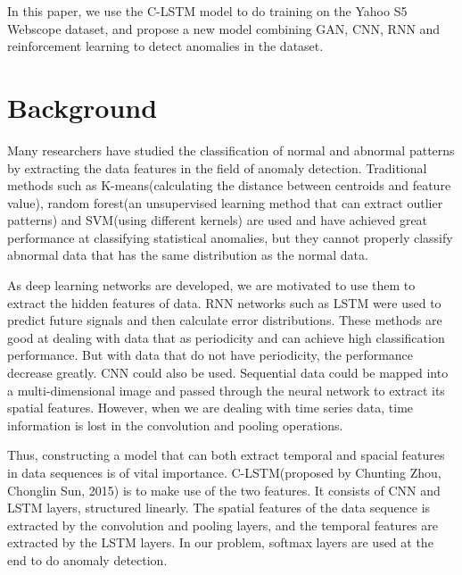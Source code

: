 \documentclass{acmtog} %
\begin{document}
In this paper, we use the C-LSTM model to do training on the Yahoo S5 Webscope dataset, and propose a new model combining GAN, CNN, RNN and reinforcement learning to detect anomalies in the dataset.



\section{Background}
Many researchers have studied the classification of normal and abnormal patterns by extracting the data features in the field of anomaly detection. Traditional methods such as K-means(calculating the distance between centroids and feature value), random forest(an unsupervised learning method that can extract outlier patterns) and SVM(using different kernels) are used and have achieved great performance at classifying statistical anomalies, but they cannot properly classify abnormal data that has the same distribution as the normal data. 

As deep learning networks are developed, we are motivated to use them to extract the hidden features of data. RNN networks such as LSTM were used to predict future signals and then calculate error distributions. These methods are good at dealing with data that as periodicity and can achieve high classification performance. But with data that do not have periodicity, the performance decrease greatly. CNN could also be used. Sequential data could be mapped into a multi-dimensional image and passed through the neural network to extract its spatial features. However, when we are dealing with time series data, time information is lost in the convolution and pooling operations. 

Thus, constructing a model that can both extract temporal and spacial features in data sequences is of vital importance. C-LSTM(proposed by Chunting Zhou, Chonglin Sun, 2015) is to make use of the two features. It consists of CNN and LSTM layers, structured linearly. The spatial features of the data sequence is extracted by the convolution and pooling layers, and the temporal features are extracted by the LSTM layers. In our problem, softmax layers are used at the end to do anomaly detection.
\end{document}
